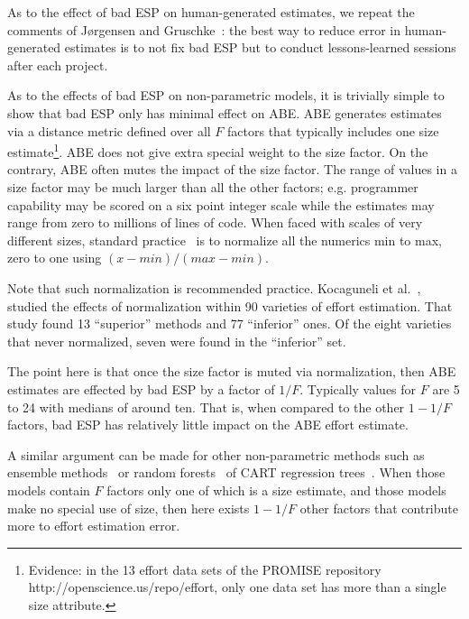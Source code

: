 \documentclass[final,twocolumn]{elsarticle}
\theoremstyle{break}
\begin{document}
As to the effect of bad ESP on human-generated estimates, we repeat the comments of
J{\o}rgensen and Gruschke~\cite{jorgensen09}: the best way to reduce error
in human-generated estimates is to not fix bad ESP but to
conduct lessons-learned sessions after each project. 
 
As to the effects of bad ESP on  non-parametric models, it is
 trivially simple to show that bad ESP only has minimal effect on ABE.
 ABE generates estimates via a distance metric
 defined over all $F$ factors that typically includes one size estimate\footnote{Evidence:
   in the 13  effort data sets of the PROMISE repository http://openscience.us/repo/effort, only one data set has more than a single
   size attribute.}. ABE does not give extra special weight to the size factor.
 On the contrary, ABE often mutes the impact of the size factor.
The range of values in a size factor may be much larger than all the other factors; e.g. programmer
 capability may be scored on a six point integer scale while the estimates may
 range from zero to millions of lines of code. When faced with scales of very
 different sizes, standard practice~\cite{koc11b,aha1991instance} is to
 normalize all the numerics min to max, zero to one using
 \mbox{$(x-\mathit{min})/(\mathit{max} - \mathit{min})$}.

  Note that such normalization is recommended practice. 
 Kocaguneli et al.~\cite{Kocaguneli2012z}, studied the effects of  normalization
 within 90 varieties of effort estimation. That study found 13 ``superior''
 methods and 77 ``inferior'' ones. Of the eight varieties that never normalized,
 seven were found in the ``inferior'' set.

 The point here is that once the size factor is muted via normalization,
  then ABE estimates are effected by bad ESP by a factor of
   $1/F$. Typically values for $F$ are 5 to 24
  with medians of around ten. That is, when compared to the other $1-1/F$ factors,  bad ESP has relatively
  little impact on the ABE effort estimate.
 
A similar argument can be made for other non-parametric methods such as ensemble
methods~\cite{Kocaguneli2012z} or random forests~\cite{breiman2001random} of
CART regression trees~\cite{breiman1984classification}. When those models contain
$F$ factors only one of which is a size estimate, and those models make no
special use of size, then here exists $1-1/F$ other factors that contribute more
to effort estimation error.
\end{document}

